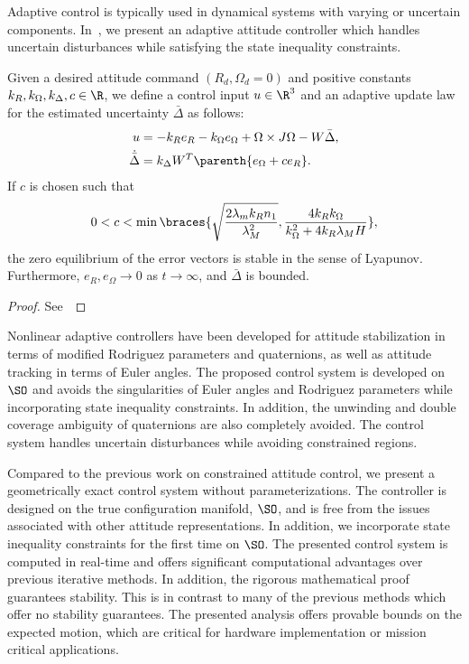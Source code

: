 Adaptive control is typically used in dynamical systems with varying or uncertain components.
In~, we present an adaptive attitude controller which handles uncertain disturbances while satisfying the state inequality constraints.

\begin{prop}\label{prop:adaptive_control}
Given  a desired attitude command \( (R_d, \Omega_d = 0 )\) and positive constants \( k_R, k_\Omega, k_\Delta, c \in \R \), we define a control input \( u \in \R^3\) and an adaptive update law for the estimated uncertainty \( \bar{\Delta} \) as follows:
\begin{align}
	u &= - k_R e_R - k_\Omega e_\Omega + \Omega \times J \Omega - W \bar{\Delta} , \label{eqn:adaptive_control} \\
	\dot{\bar{\Delta}} &= k_\Delta W^T \parenth{e_\Omega + c e_R} . \label{eqn:delta_dot}
\end{align}
If \( c \) is chosen such that
\begin{gather}
	0 < c < \min \braces{\sqrt{\frac{2 \lambda_m k_R n_1}{\lambda_M^2}},
	\frac{4 k_R k_\Omega}{k_\Omega^2 + 4 k_R \lambda_M H}} , \label{eqn:c_bound}
\end{gather}
  the zero equilibrium of the error vectors is stable in the sense of Lyapunov. Furthermore, $e_R,e_\Omega\rightarrow 0$ as $t\rightarrow\infty$, and $\bar\Delta$ is  bounded.
\end{prop}
\begin{proof}
See~
\end{proof}

Nonlinear adaptive controllers have been developed for attitude stabilization in terms of modified Rodriguez parameters and quaternions, as well as attitude tracking in terms of Euler angles. 
The proposed control system is developed on \(\SO\) and avoids the singularities of Euler angles and Rodriguez parameters while incorporating state inequality constraints. 
In addition, the unwinding and double coverage ambiguity of quaternions are also completely avoided. 
The control system handles uncertain disturbances while avoiding constrained regions.

Compared to the previous work on constrained attitude control, we present a geometrically exact control system without parameterizations.
The controller is designed on the true configuration manifold, \( \SO \), and is free from the issues associated with other attitude representations.
In addition, we incorporate state inequality constraints for the first time on \( \SO \).
The presented control system is computed in real-time and offers significant computational advantages over previous iterative methods. 
In addition, the rigorous mathematical proof guarantees stability.
This is in contrast to many of the previous methods which offer no stability guarantees.
The presented analysis offers provable bounds on the expected motion, which are critical for hardware implementation or mission critical applications.

